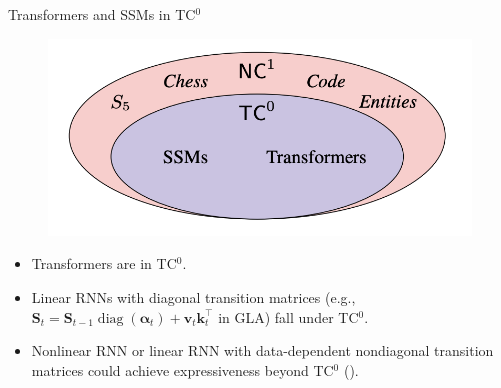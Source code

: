 

\begin{frame}{Transformers and SSMs in TC$^0$}
    \begin{figure}
        \centering
        \includegraphics[width=.45\linewidth]{figure/tc0.png}
    \end{figure}
    \vspace{-2mm}
\begin{itemize}
    \item Transformers are in TC$^0$.
    \item Linear RNNs with {\color{red}diagonal transition matrices} (e.g., $\mathbf{S}_t = \mathbf{S}_{t-1} \operatorname{diag}(\boldsymbol{\alpha}_t) + \mathbf{v}_t \mathbf{k}_t^\top$ in GLA) fall under TC$^0$.
    \item {\color{red} Nonlinear RNN} or linear RNN with {\color{red} data-dependent nondiagonal transition matrices} could achieve expressiveness beyond TC$^0$ (\cite{Merrill2024TheIO}).
\end{itemize}
\end{frame}

